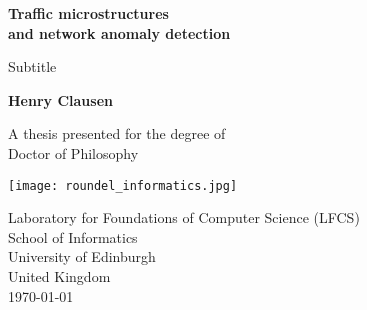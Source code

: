 \begin{titlepage}
   \begin{center}
       \vspace*{1cm}
 		\Huge
       \textbf{Traffic microstructures\\ and network anomaly detection}
       
		\LARGE
       \vspace{0.5cm}
        Subtitle
            
       \vspace{0.8cm}

       \textbf{Henry Clausen}

\BgThispage
       \vfill
            
       A thesis presented for the degree of\\
       Doctor of Philosophy
            
       \vspace{0.5cm}
     


\texttt{[image: roundel\_informatics.jpg]}
            
\large Laboratory for Foundations of Computer Science (LFCS)\\            
\large School of Informatics\\
University of Edinburgh\\
United Kingdom\\
\today
            
   \end{center}
\end{titlepage}